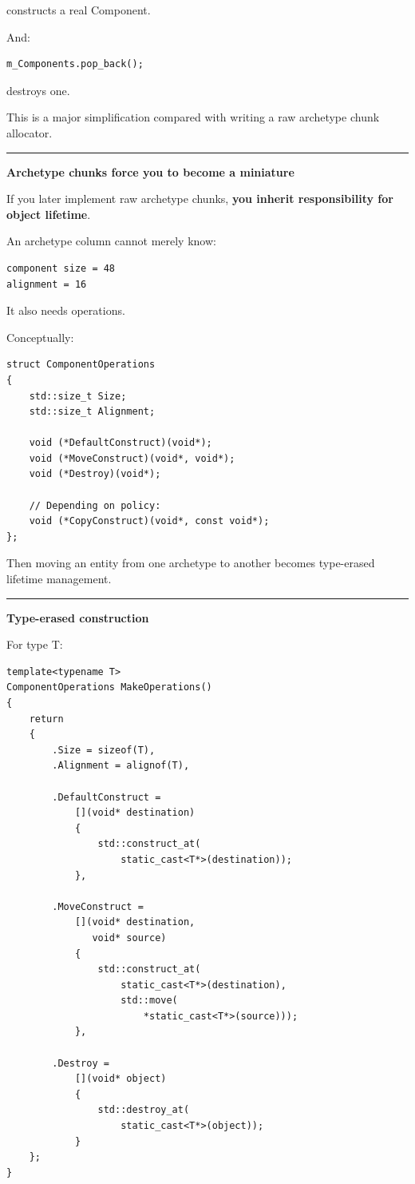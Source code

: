 constructs a real Component.

And:

\begin{verbatim}
m_Components.pop_back();
\end{verbatim}

destroys one.

This is a major simplification compared with writing a raw archetype chunk allocator.

\begin{center}\rule{0.5\linewidth}{0.5pt}\end{center}

\textbf{Archetype chunks force you to become a miniature }

If you later implement raw archetype chunks, \textbf{you inherit responsibility for object lifetime}.

An archetype column cannot merely know:

\begin{verbatim}
component size = 48
alignment = 16
\end{verbatim}

It also needs operations.

Conceptually:

\begin{verbatim}
struct ComponentOperations
{
    std::size_t Size;
    std::size_t Alignment;

    void (*DefaultConstruct)(void*);
    void (*MoveConstruct)(void*, void*);
    void (*Destroy)(void*);

    // Depending on policy:
    void (*CopyConstruct)(void*, const void*);
};
\end{verbatim}

Then moving an entity from one archetype to another becomes type-erased lifetime management.

\begin{center}\rule{0.5\linewidth}{0.5pt}\end{center}

\textbf{Type-erased construction}

For type T:

\begin{verbatim}
template<typename T>
ComponentOperations MakeOperations()
{
    return
    {
        .Size = sizeof(T),
        .Alignment = alignof(T),

        .DefaultConstruct =
            [](void* destination)
            {
                std::construct_at(
                    static_cast<T*>(destination));
            },

        .MoveConstruct =
            [](void* destination,
               void* source)
            {
                std::construct_at(
                    static_cast<T*>(destination),
                    std::move(
                        *static_cast<T*>(source)));
            },

        .Destroy =
            [](void* object)
            {
                std::destroy_at(
                    static_cast<T*>(object));
            }
    };
}
\end{verbatim}

